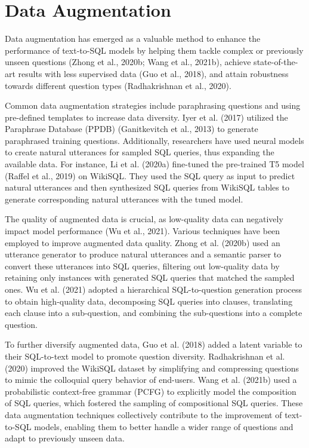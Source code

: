 \section{Data Augmentation}
\label{sec:augmentation}

Data augmentation has emerged as a valuable method to enhance the performance of text-to-SQL models by helping them tackle complex or previously unseen questions (Zhong et al., 2020b; Wang et al., 2021b), achieve state-of-the-art results with less supervised data (Guo et al., 2018), and attain robustness towards different question types (Radhakrishnan et al., 2020).

Common data augmentation strategies include paraphrasing questions and using pre-defined templates to increase data diversity. Iyer et al. (2017) utilized the Paraphrase Database (PPDB) (Ganitkevitch et al., 2013) to generate paraphrased training questions. Additionally, researchers have used neural models to create natural utterances for sampled SQL queries, thus expanding the available data. For instance, Li et al. (2020a) fine-tuned the pre-trained T5 model (Raffel et al., 2019) on WikiSQL. They used the SQL query as input to predict natural utterances and then synthesized SQL queries from WikiSQL tables to generate corresponding natural utterances with the tuned model.

The quality of augmented data is crucial, as low-quality data can negatively impact model performance (Wu et al., 2021). Various techniques have been employed to improve augmented data quality. Zhong et al. (2020b) used an utterance generator to produce natural utterances and a semantic parser to convert these utterances into SQL queries, filtering out low-quality data by retaining only instances with generated SQL queries that matched the sampled ones. Wu et al. (2021) adopted a hierarchical SQL-to-question generation process to obtain high-quality data, decomposing SQL queries into clauses, translating each clause into a sub-question, and combining the sub-questions into a complete question.

To further diversify augmented data, Guo et al. (2018) added a latent variable to their SQL-to-text model to promote question diversity. Radhakrishnan et al. (2020) improved the WikiSQL dataset by simplifying and compressing questions to mimic the colloquial query behavior of end-users. Wang et al. (2021b) used a probabilistic context-free grammar (PCFG) to explicitly model the composition of SQL queries, which fostered the sampling of compositional SQL queries. These data augmentation techniques collectively contribute to the improvement of text-to-SQL models, enabling them to better handle a wider range of questions and adapt to previously unseen data.